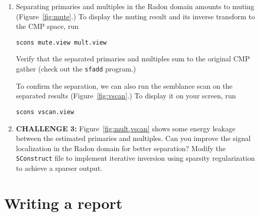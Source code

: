 \begin{enumerate}
\item Separating primaries and multiples in the Radon domain amounts to muting (Figure~\ref{fig:mute}.) To display the muting result and its inverse transform to the CMP space, run
\begin{verbatim}
scons mute.view mult.view
\end{verbatim}
Verify that the separated primaries and multiples sum to the original CMP gather (check out the \texttt{sfadd} program.)

To confirm the separation, we can also run the semblance scan on the separated results (Figure~\ref{fig:vscan}.) To display it on your screen, run
\begin{verbatim}
scons vscan.view
\end{verbatim}



\item \textbf{CHALLENGE 3:} Figure~\ref{fig:mult,vscan} shows some energy leakage between the estimated primaries and multiples. Can you improve the signal localization in the Radon domain for better separation? Modify the \texttt{SConstruct} file to implement iterative inversion using sparsity regularization to achieve a sparser output.

\end{enumerate}

\lstset{language=c,numbers=left,numberstyle=\tiny,showstringspaces=false}


\lstset{language=python,numbers=left,numberstyle=\tiny,showstringspaces=false}


\section{Writing a report}

